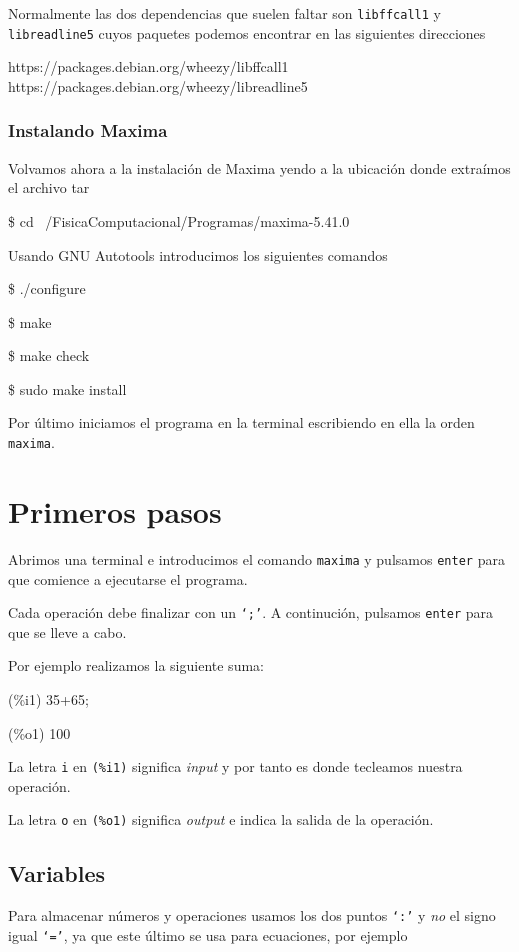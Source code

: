 \documentclass[a4paper, 12pt] {article}
\begin{document}
Normalmente las dos dependencias que suelen faltar son \texttt{libffcall1} y \texttt{libreadline5} cuyos paquetes podemos encontrar en las siguientes direcciones
\begin{center}
  https://packages.debian.org/wheezy/libffcall1
  https://packages.debian.org/wheezy/libreadline5
\end{center}
\subsubsection{Instalando Maxima}
Volvamos ahora a la instalación de Maxima yendo a la ubicación donde extraímos el archivo tar
\begin{center}
\$ cd ~/FisicaComputacional/Programas/maxima-5.41.0 \\
\end{center}

Usando GNU Autotools introducimos los siguientes comandos
\begin{center}
  \$  ./configure
  
  \$  make
  
  \$  make check
  
  \$  sudo make install
  
\end{center}

Por último iniciamos el programa en la terminal escribiendo en ella la orden \texttt{maxima}.

\section{Primeros pasos}
Abrimos una terminal e introducimos el comando \texttt{maxima} y pulsamos \texttt{enter} para que comience a ejecutarse el programa.

Cada operación debe finalizar con un \texttt{`;'}. A continución, pulsamos \texttt{enter} para que se lleve a cabo.

Por ejemplo realizamos la siguiente suma:

(\%i1) 35+65;
  
(\%o1) 100


La letra \texttt{i} en \texttt{(\%i1)} significa \textit{input} y por tanto es donde tecleamos nuestra operación.

La letra \texttt{o} en \texttt{(\%o1)} significa \textit{output} e indica la salida de la operación.

\subsection{Variables}
Para almacenar números y operaciones usamos los dos puntos \texttt{`:'} y \emph{no} el signo igual \texttt{`='}, ya que este último se usa para ecuaciones, por ejemplo
\end{document}
